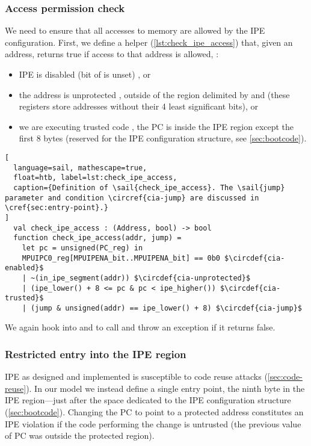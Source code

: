 \subsubsection{Access permission check}

We need to ensure that all accesses to memory are allowed by the IPE configuration. First, we define a helper  (\cref{lst:check_ipe_access}) that, given an address, returns true if access to that address is allowed, \ie:
\begin{itemize}
\item IPE is disabled (bit  of  is unset) , or
\item the address is unprotected , \ie outside of the region delimited by  and  (these registers store addresses without their 4 least significant bits), or
\item we are executing trusted code , \ie the PC is inside the IPE region except the first 8 bytes (reserved for the IPE configuration structure, see \cref{sec:bootcode}).
\end{itemize}

\startcstep
\begin{lstlisting}[
  language=sail, mathescape=true,
  float=htb, label=lst:check_ipe_access,
  caption={Definition of \sail{check_ipe_access}. The \sail{jump} parameter and condition \circref{cia-jump} are discussed in \cref{sec:entry-point}.}
]
  val check_ipe_access : (Address, bool) -> bool
  function check_ipe_access(addr, jump) =
    let pc = unsigned(PC_reg) in
    MPUIPC0_reg[MPUIPENA_bit..MPUIPENA_bit] == 0b0 $\circdef{cia-enabled}$
    | ~(in_ipe_segment(addr)) $\circdef{cia-unprotected}$
    | (ipe_lower() + 8 <= pc & pc < ipe_higher()) $\circdef{cia-trusted}$
    | (jump & unsigned(addr) == ipe_lower() + 8) $\circdef{cia-jump}$
\end{lstlisting}

We again hook into  and  to call  and throw an  exception if it returns false.

\subsubsection{Restricted entry into the IPE region}
\label{sec:entry-point}

IPE as designed and implemented is susceptible to code reuse attacks (\cref{sec:code-reuse}). In our model we instead define a single entry point, the ninth byte in the IPE region---just after the space dedicated to the IPE configuration structure (\cref{sec:bootcode}). Changing the PC to point to a protected address constitutes an IPE violation if the code performing the change is untrusted (\ie the previous value of PC was outside the protected region).

